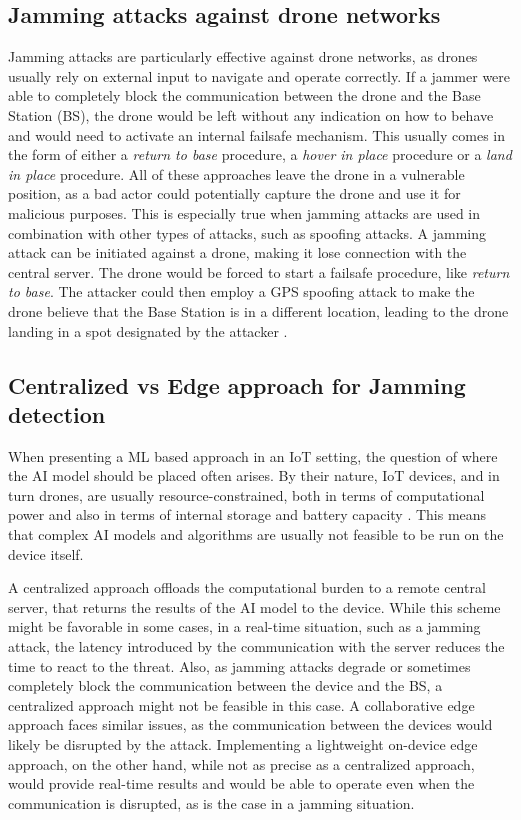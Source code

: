 \documentclass[futureinternet,article,submit,pdftex,moreauthors]{Definitions/mdpi}
\begin{document}
\subsection{Jamming attacks against drone networks}\label{JammingDroneNetworks}

Jamming attacks are particularly effective against drone networks, as drones usually rely on external input to navigate and operate correctly.
If a jammer were able to completely block the communication between the drone and the Base Station (BS), the drone would be left without any indication on how to behave and would need to activate an internal failsafe mechanism. 
This usually comes in the form of either a \textit{return to base} procedure, a \textit{hover in place} procedure or a \textit{land in place} procedure.
All of these approaches leave the drone in a vulnerable position, as a bad actor could potentially capture the drone and use it for malicious purposes.
This is especially true when jamming attacks are used in combination with other types of attacks, such as spoofing attacks. A jamming attack can be initiated against a drone, making it lose connection with the central server. 
The drone would be forced to start a failsafe procedure, like \textit{return to base}. The attacker could then employ a GPS spoofing attack to make the drone believe that the Base Station is in a different location, leading to the drone landing in a spot designated by the attacker \cite{RQ170DroneOwano}.

\subsection{Centralized vs Edge approach for Jamming detection}

When presenting a ML based approach in an IoT setting, the question of where the AI model should be placed often arises. By their nature, IoT devices, and in turn drones, are usually resource-constrained, 
both in terms of computational power and also in terms of internal storage and battery capacity \cite{6GSecurity-Chorti}. This means that complex AI models and algorithms are usually not feasible to be run on the device itself. 

A centralized approach offloads the computational burden to a remote central server, that returns the results of the AI model to the device. While this scheme might be favorable in some cases, in a real-time situation, such as a jamming attack, the latency introduced by the
communication with the server reduces the time to react to the threat. Also, as jamming attacks degrade or sometimes completely block the communication between the device and the BS, a centralized approach might not be feasible in this case.
A collaborative edge approach faces similar issues, as the communication between the devices would likely be disrupted by the attack. 
Implementing a lightweight on-device edge approach, on the other hand, while not as precise as a centralized approach, would provide real-time results and would be able to operate even when the communication is disrupted, as is the case in a jamming situation. 
\end{document}
